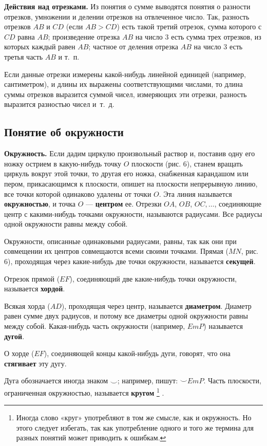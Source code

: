 \documentclass[oneside]{book}
\begin{document}
\textbf{Действия над отрезками.}
Из понятия о сумме выводятся понятия о разности отрезков, умножении и делении отрезков на отвлеченное число.
Так, разность отрезков $AB$ и $CD$ (если $AB>CD$) есть такой третий отрезок, сумма которого с $CD$ равна $AB$;
произведение отрезка $AB$ на число 3 есть сумма трех отрезков, из которых каждый равен $AB$;
частное от деления отрезка $AB$ на число 3 есть третья часть $AB$ и т.~п.

Если данные отрезки измерены какой-нибудь линейной единицей (например, сантиметром), и длины их выражены соответствующими числами, то длина суммы отрезков выразится суммой чисел, измеряющих эти отрезки, разность выразится разностью чисел и~т.~д.

\subsection*{Понятие об окружности}

\textbf{Окружность.}
Если дадим циркулю произвольный раствор и, поставив одну его ножку острием в какую-нибудь точку $O$ плоскости (рис. 6), станем вращать циркуль вокруг этой точки, то другая его ножка, снабженная карандашом или пером, прикасающимся к плоскости, опишет на плоскости непрерывную линию, все точки которой одинаково удалены от точки $O$.
Эта линия называется \textbf{окружностью}, и точка $O$ — \textbf{центром} ее.
Отрезки $OA$, $OB$, $OC,\dots$, соединяющие центр с какими-нибудь точками окружности, называются радиусами.
Все радиусы одной окружности равны между собой.

Окружности, описанные одинаковыми радиусами, равны, так как они при совмещении их центров совмещаются всеми своими точками.
Прямая ($MN$, рис. 6), проходящая через какие-нибудь две точки окружности, называется \textbf{секущей}.

Отрезок прямой ($EF$), соединяющий две какие-нибудь точки окружности, называется \textbf{хордой}.

Всякая хорда ($AD$), проходящая через центр, называется \textbf{диаметром}.
Диаметр равен сумме двух радиусов, и потому все диаметры одной окружности равны между собой.
Какая-нибудь часть окружности (например, $EmP$) называется \textbf{дугой}.

О хорде ($EF$), соединяющей концы какой-нибудь дуги, говорят, что она \textbf{стягивает} эту дугу.

Дуга обозначается иногда знаком $\smallsmile$;
например, пишут: ${\smallsmile} EmP$.
Часть плоскости, ограниченная окружностью, называется \textbf{кругом}%
\footnote{Иногда слово «круг» употребляют в том же смысле, как и окружность.
Но этого следует избегать, так как употребление одного и того же термина для разных понятий может приводить к ошибкам.}%
.
\end{document}
